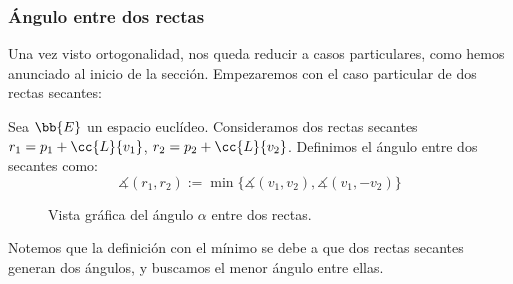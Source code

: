 \subsubsection{Ángulo entre dos rectas}
Una vez visto ortogonalidad, nos queda reducir a casos particulares, como hemos anunciado al inicio de la sección. Empezaremos con el caso particular de dos rectas secantes:
\begin{definicion}
    Sea $\bb{E}$ un espacio euclídeo. Consideramos dos rectas secantes $r_1=p_1 + \cc{L}\{v_1\}$, $r_2=p_2 + \cc{L}\{v_2\}$. Definimos el ángulo entre dos secantes como:
    \begin{equation*}
        \measuredangle(r_1,r_2)
        := \min\{\measuredangle(v_1,v_2), \measuredangle(v_1,-v_2)\}
    \end{equation*}
    \begin{figure}[H]
        \centering
        \caption{Vista gráfica del ángulo $\alpha$ entre dos rectas.}
    \end{figure}
\end{definicion}
Notemos que la definición con el mínimo se debe a que dos rectas secantes generan dos ángulos, y buscamos el menor ángulo entre ellas.

